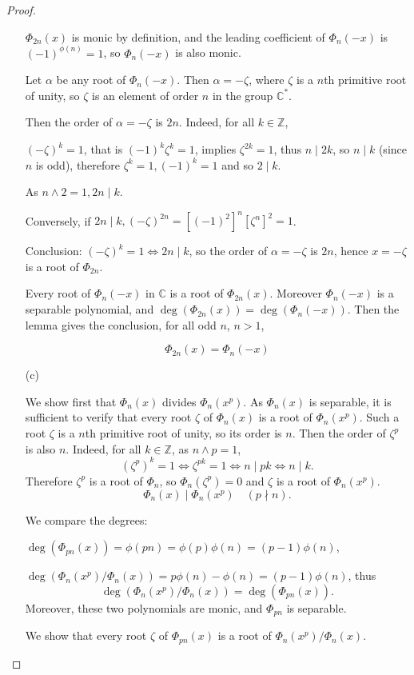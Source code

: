 \documentclass[11pt,a4paper]{article}
\newcommand{\Z}{\mathbb{Z}}
\newcommand{\C}{\mathbb{C}}
\begin{document}
\begin{proof}
\begin{enumerate}
$\Phi_{2n}(x)$ is monic by definition, and the leading coefficient of $\Phi_n(-x)$ is $(-1)^{\phi(n)} = 1$, so $\Phi_n(-x)$ is also monic.

Let $\alpha$ be any root of $\Phi_n(-x)$. Then $\alpha = -\zeta$, where $\zeta$ is a $n$th primitive root of unity, so $\zeta$ is an element of order $n$ in the group $\mathbb{C}^*$.

Then the order of $\alpha = -\zeta$ is $2n$. Indeed, for all $k \in \mathbb{Z}$,

$(-\zeta)^k = 1$, that is  $(-1)^k \zeta^k = 1$, implies $\zeta^{2k} = 1$, thus  $n \mid 2k$, so  $n \mid k$ (since $n$ is odd), therefore $\zeta^k = 1, (-1)^k = 1$ and so  $2\mid k$.

As $n \wedge 2 = 1, 2n \mid k$.

Conversely, if $2n \mid k, (-\zeta)^{2n} = [(-1)^2]^n [\zeta^n]^2 = 1$.

Conclusion: $(-\zeta)^k = 1 \iff 2n \mid k$, so the order of $\alpha = -\zeta$ is $2n$, hence $x = -\zeta$  is a root of $\Phi_{2n}$.

Every root of $\Phi_n(-x)$ in $\C$  is a root of $\Phi_{2n}(x)$. Moreover $\Phi_n(-x)$  is a separable polynomial, and $\deg(\Phi_{2n}(x)) = \deg(\Phi_n(-x))$.  Then the lemma gives the conclusion, for all odd $n$, $n>1$,

$$\Phi_{2n}(x) = \Phi_n(-x)$$

\item[(c)]

We show first that $\Phi_n(x)$ divides $\Phi_n(x^p)$. As $\Phi_n(x)$ is separable, it is sufficient to verify that every root $\zeta$ of $\Phi_n(x)$ is a root of $\Phi_n(x^p)$. Such a root   $\zeta$  is a $n$th primitive root of unity, so its order is $n$. Then the order of $\zeta^p$ is also $n$. Indeed, for all $k\in \Z$, as $n\wedge p = 1$,
$$(\zeta^p)^k=1 \iff \zeta^{pk} = 1 \iff n \mid pk \iff n \mid k.$$
Therefore $\zeta^p$ is a root of $\Phi_n$, so $\Phi_n(\zeta^p)=0$ and $\zeta$ is a root of $\Phi_n(x^p)$.
$$\Phi_n(x) \mid \Phi_n(x^p)\quad (p\nmid n).$$

We compare the degrees: 

$\deg(\Phi_{pn}(x)) = \phi(pn) =\phi(p)\phi(n) = (p-1)\phi(n)$,

$\deg(\Phi_n(x^p)/\Phi_n(x)) = p \phi(n) - \phi(n) = (p-1)\phi(n)$, 
thus
$$\deg(\Phi_n(x^p)/\Phi_n(x)) = \deg(\Phi_{pn}(x)).$$
Moreover, these two polynomials are monic, and $\Phi_{pn}$ is separable.

We show that every root $\zeta$ of $\Phi_{pn}(x)$ is a root of $\Phi_n(x^p)/\Phi_n(x)$.


\end{enumerate}
\end{proof}
\end{document}
